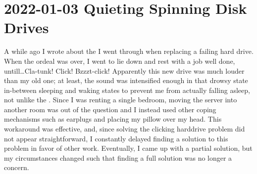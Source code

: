 \documentclass{article}
\begin{document}
\section{2022-01-03 Quieting Spinning Disk Drives}
A while ago I wrote about the  I went through when replacing a failing hard drive.  When the ordeal was over, I went to lie down and rest with a job well done, untill\ldots Cla-tunk!  Click!  Bzzzt-click!  Apparently this new drive was much louder than my old one; at least, the sound was intensified enough in that drowsy state in-between sleeping and waking states to prevent me from actually falling asleep, not unlike the .  Since I was renting a single bedroom, moving the server into another room was out of the question and I instead used other coping mechanisms such as earplugs and placing my pillow over my head.  This workaround was effective, and, since solving the clicking harddrive problem did not appear straightforward, I constantly delayed finding a solution to this problem in favor of other work.  Eventually, I came up with a partial solution, but my circumstances changed such that finding a full solution was no longer a concern.
\end{document}

